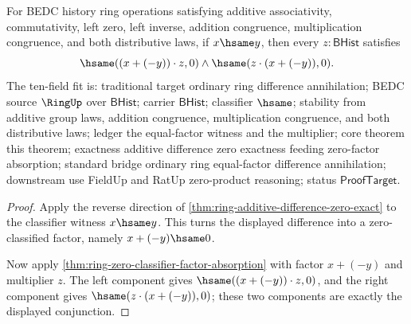 \begin{theorem}
\label{thm:ring-equal-factor-difference-annihilation}
For BEDC history ring operations satisfying additive associativity,
commutativity, left zero, left inverse, addition congruence, multiplication
congruence, and both distributive laws, if $x\hsame y$, then every
$z:\mathsf{BHist}$ satisfies
$$
\hsame((x+(-y))\cdot z,0)\land \hsame(z\cdot(x+(-y)),0).
$$
The ten-field fit is: traditional target ordinary ring difference
annihilation; BEDC source $\RingUp$ over $\mathsf{BHist}$; carrier
$\mathsf{BHist}$; classifier $\hsame$; stability from additive group laws,
addition congruence, multiplication congruence, and both distributive laws;
ledger the equal-factor witness and the multiplier; core theorem this theorem;
exactness additive difference zero exactness feeding zero-factor absorption;
standard bridge ordinary ring equal-factor difference annihilation; downstream
use FieldUp and RatUp zero-product reasoning; status $\mathsf{ProofTarget}$.
\end{theorem}
\begin{proof}
Apply the reverse direction of
\autoref{thm:ring-additive-difference-zero-exact} to the classifier witness
$x\hsame y$. This turns the displayed difference into a zero-classified factor,
namely $x+(-y)\hsame0$.

Now apply \autoref{thm:ring-zero-classifier-factor-absorption} with factor
$x+(-y)$ and multiplier $z$. The left component gives
$\hsame((x+(-y))\cdot z,0)$, and the right component gives
$\hsame(z\cdot(x+(-y)),0)$; these two components are exactly the displayed
conjunction.
\end{proof}

